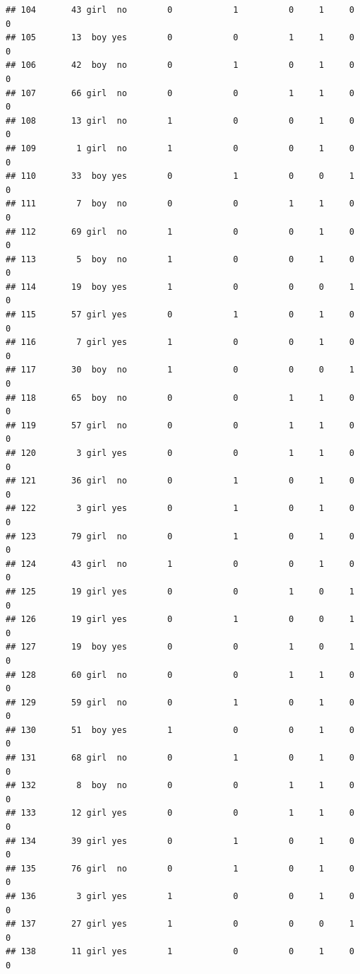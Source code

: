 \documentclass[man]{apa6}
\begin{document}
\begin{verbatim}
## 104       43 girl  no        0            1          0     1     0     0
## 105       13  boy yes        0            0          1     1     0     0
## 106       42  boy  no        0            1          0     1     0     0
## 107       66 girl  no        0            0          1     1     0     0
## 108       13 girl  no        1            0          0     1     0     0
## 109        1 girl  no        1            0          0     1     0     0
## 110       33  boy yes        0            1          0     0     1     0
## 111        7  boy  no        0            0          1     1     0     0
## 112       69 girl  no        1            0          0     1     0     0
## 113        5  boy  no        1            0          0     1     0     0
## 114       19  boy yes        1            0          0     0     1     0
## 115       57 girl yes        0            1          0     1     0     0
## 116        7 girl yes        1            0          0     1     0     0
## 117       30  boy  no        1            0          0     0     1     0
## 118       65  boy  no        0            0          1     1     0     0
## 119       57 girl  no        0            0          1     1     0     0
## 120        3 girl yes        0            0          1     1     0     0
## 121       36 girl  no        0            1          0     1     0     0
## 122        3 girl yes        0            1          0     1     0     0
## 123       79 girl  no        0            1          0     1     0     0
## 124       43 girl  no        1            0          0     1     0     0
## 125       19 girl yes        0            0          1     0     1     0
## 126       19 girl yes        0            1          0     0     1     0
## 127       19  boy yes        0            0          1     0     1     0
## 128       60 girl  no        0            0          1     1     0     0
## 129       59 girl  no        0            1          0     1     0     0
## 130       51  boy yes        1            0          0     1     0     0
## 131       68 girl  no        0            1          0     1     0     0
## 132        8  boy  no        0            0          1     1     0     0
## 133       12 girl yes        0            0          1     1     0     0
## 134       39 girl yes        0            1          0     1     0     0
## 135       76 girl  no        0            1          0     1     0     0
## 136        3 girl yes        1            0          0     1     0     0
## 137       27 girl yes        1            0          0     0     1     0
## 138       11 girl yes        1            0          0     1     0     0

\end{verbatim}
\end{document}
